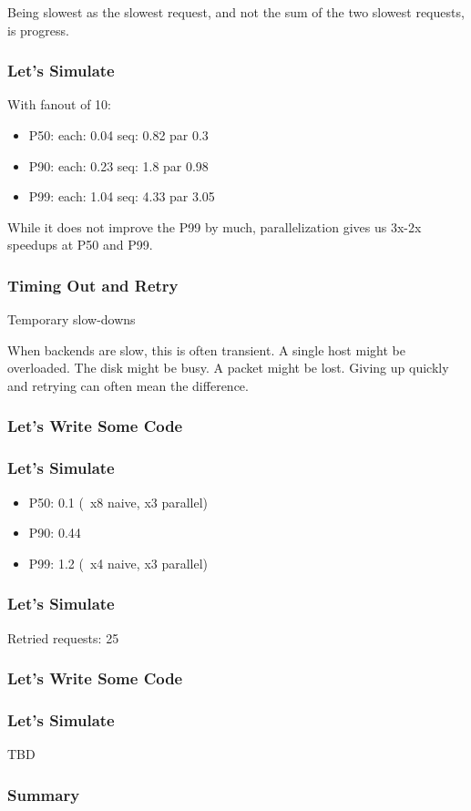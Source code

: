 Being slowest as the slowest request,
and not the sum of the two slowest requests,
is progress.

\begin{frame}
\frametitle{Let's Simulate}

With fanout of 10:

\begin{itemize}
\item P50: each: 0.04 seq: 0.82 par 0.3
\item P90: each: 0.23 seq: 1.8 par 0.98
\item P99: each: 1.04 seq: 4.33 par 3.05
\end{itemize}

\end{frame}

While it does not improve the P99 by much,
parallelization gives us 3x-2x speedups
at P50 and P99.

\begin{frame}
\frametitle{Timing Out and Retry}

Temporary slow-downs

\end{frame}

When backends are slow, this is often transient.
A single host might be overloaded.
The disk might be busy.
A packet might be lost.
Giving up quickly and retrying can often mean the difference.

\begin{frame}
\frametitle{Let's Write Some Code}



\end{frame}


\begin{frame}
\frametitle{Let's Simulate}

\begin{itemize}
\item P50: 0.1 (~x8 naive, x3 parallel)
\item P90: 0.44
\item P99: 1.2 (~x4 naive, x3 parallel) \pause
\end{itemize}

\end{frame}

\begin{frame}
\frametitle{Let's Simulate}

Retried requests: 25%

\end{frame}


\begin{frame}
\frametitle{Let's Write Some Code}



\end{frame}

\begin{frame}
\frametitle{Let's Simulate}

TBD

\end{frame}

\begin{frame}
\frametitle{Summary}
\end{frame}



